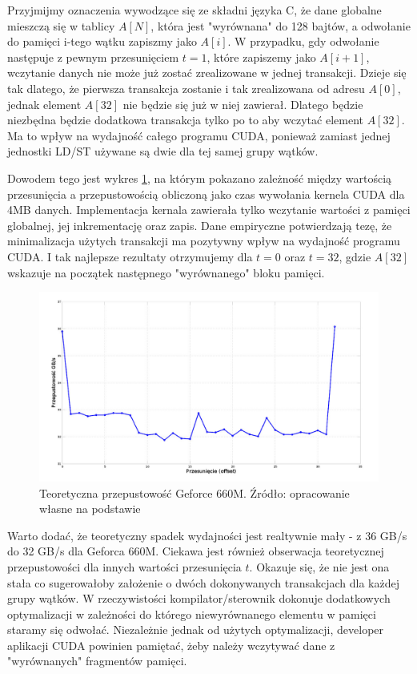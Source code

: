 Przyjmijmy oznaczenia wywodzące się ze składni języka C, że dane globalne mieszczą się w
tablicy $A[N]$, która jest "wyrównana" do 128 bajtów, a odwołanie do
pamięci i-tego wątku zapiszmy jako $A[i]$. W przypadku, gdy odwołanie następuje
z pewnym przesunięciem $t = 1$, które zapiszemy jako $A[i + 1]$, wczytanie danych
nie może już zostać zrealizowane w jednej transakcji. Dzieje się tak dlatego, że
pierwsza transakcja zostanie i tak zrealizowana od adresu $A[0]$, jednak element
$A[32]$ nie będzie się już w niej zawierał. Dlatego będzie niezbędna będzie
dodatkowa transakcja tylko po to aby wczytać element $A[32]$. Ma to wpływ na
wydajność całego programu CUDA, ponieważ zamiast jednej jednostki LD/ST używane
są dwie dla tej samej grupy wątków. 

Dowodem tego jest wykres \ref{hier2}, na którym pokazano
zależność między wartością przesunięcia a przepustowością obliczoną jako czas
wywołania kernela CUDA dla 4MB danych. Implementacja kernala zawierała tylko
wczytanie wartości z pamięci globalnej, jej inkrementację oraz zapis.
Dane empiryczne potwierdzają tezę, że minimalizacja użytych transakcji ma
pozytywny wpływ na wydajność programu CUDA. I tak najlepsze rezultaty
otrzymujemy dla $t = 0$ oraz $t = 32$, gdzie $A[32]$ wskazuje na początek 
następnego "wyrównanego" bloku pamięci.

\begin{figure}[H]
\centering
\includegraphics[scale=0.4]{images/gf660_offset.png}
\caption{Teoretyczna przepustowość Geforce 660M. Źródło: opracowanie własne na
	podstawie \cite{memperf}}
\label{hier2}
\end{figure}

Warto dodać, że teoretyczny spadek wydajności jest realtywnie
mały - z 36 GB/s do 32 GB/s dla Geforca 660M. Ciekawa jest również obserwacja
teoretycznej przepustowości dla innych wartości przesunięcia $t$. Okazuje się,
			 że nie jest ona stała co sugerowałoby założenie o dwóch dokonywanych
			 transakcjach dla każdej grupy wątków. W rzeczywistości
			 kompilator/sterownik dokonuje dodatkowych optymalizacji w
			 zależności do którego niewyrównanego elementu w pamięci staramy się
			 odwołać. Niezależnie jednak od użytych optymalizacji, developer aplikacji CUDA
			 powinien pamiętać, żeby należy wczytywać dane z "wyrównanych"
			 fragmentów pamięci.

